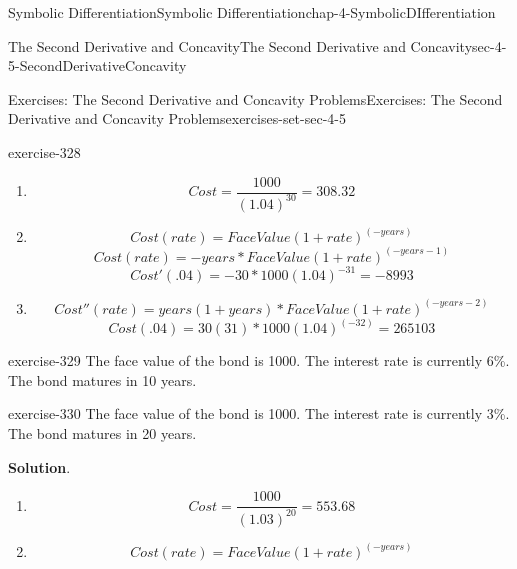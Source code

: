 \documentclass[oneside,10pt,]{book}
\numberwithin{equation}{section}
\begin{document}
\begin{chapterptx}{Symbolic Differentiation}{}{Symbolic Differentiation}{}{}{chap-4-SymbolicDIfferentiation}
\begin{sectionptx}{The Second Derivative and Concavity}{}{The Second Derivative and Concavity}{}{}{sec-4-5-SecondDerivativeConcavity}
\begin{exercises-subsection-numberless}{Exercises: The Second Derivative and Concavity Problems}{}{Exercises: The Second Derivative and Concavity Problems}{}{}{exercises-set-sec-4-5}
\begin{exercisegroup}
\begin{divisionexerciseeg}{15}{}{}{exercise-328}
\leavevmode%
\begin{enumerate}[label=(\alph*)]
\item\hypertarget{li-561}{}%
\begin{equation*}
Cost=\frac{1000}{(1.04)^30} =308.32
\end{equation*}
%
\item\hypertarget{li-562}{}%
\begin{equation*}
Cost(rate)=FaceValue(1+rate)^{(-years)}
\end{equation*}
%
\begin{equation*}
Cost(rate)=-years*FaceValue(1+rate)^{(-years-1)}
\end{equation*}
%
\begin{equation*}
Cost'(.04)=-30*1000(1.04)^{-31}=-8993
\end{equation*}
%
\item\hypertarget{li-563}{}%
\begin{equation*}
Cost''(rate)=years(1+years)*FaceValue(1+rate)^{(-years-2)}
\end{equation*}
%
\begin{equation*}
Cost(.04)=30(31)*1000(1.04)^(-32)=265103
\end{equation*}
%
\end{enumerate}
\end{divisionexerciseeg}%
\begin{divisionexerciseeg}{16}{}{}{exercise-329}%
\hypertarget{p-1857}{}%
The face value of the bond is \textdollar{}1000.  The interest rate is currently 6\%.  The bond matures in 10 years.%
\end{divisionexerciseeg}%
\begin{divisionexerciseeg}{17}{}{}{exercise-330}%
\hypertarget{p-1858}{}%
The face value of the bond is \textdollar{}1000.  The interest rate is currently 3\%.  The bond matures in 20 years.%
\par\smallskip%
\noindent\textbf{Solution}.\hypertarget{solution-165}{}\quad%
\leavevmode%
\begin{enumerate}[label=(\alph*)]
\item\hypertarget{li-564}{}%
\begin{equation*}
Cost=\frac{1000}{(1.03)^20} =553.68
\end{equation*}
%
\item\hypertarget{li-565}{}%
\begin{equation*}
Cost(rate)=FaceValue(1+rate)^{(-years)}
\end{equation*}
%
\begin{equation*}

\end{equation*}
\end{enumerate}
\end{divisionexerciseeg}
\end{exercisegroup}
\end{exercises-subsection-numberless}
\end{sectionptx}
\end{chapterptx}
\end{document}
